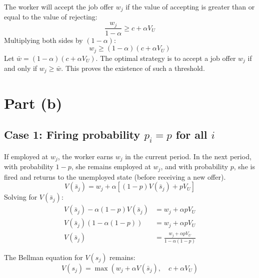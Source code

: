 \documentclass[11pt, a4paper, oneside]{memoir}
\begin{document}
The worker will accept the job offer $w_j$ if the value of accepting is greater than or equal to the value of rejecting:
\[ \frac{w_j}{1-\alpha} \ge c + \alpha V_U \]
Multiplying both sides by $(1-\alpha)$:
\[ w_j \ge (1-\alpha)(c + \alpha V_U) \]
Let $\bar{w} = (1-\alpha)(c + \alpha V_U)$.
The optimal strategy is to accept a job offer $w_j$ if and only if $w_j \ge \bar{w}$.
This proves the existence of such a threshold.

\section{Part (b)}
\subsection*{Case 1: Firing probability $p_i = p$ for all $i$}
If employed at $w_j$, the worker earns $w_j$ in the current period.
In the next period, with probability $1-p$, she remains employed at $w_j$,
and with probability $p$, she is fired and returns to the unemployed state (before receiving a new offer).
\[ V(\bar{s}_j) = w_j + \alpha \left[ (1-p)V(\bar{s}_j) + p V_U \right] \]
Solving for $V(\bar{s}_j)$:
\begin{align*} V(\bar{s}_j) - \alpha(1-p)V(\bar{s}_j) &= w_j + \alpha p V_U \\ V(\bar{s}_j) (1 - \alpha(1-p)) &= w_j + \alpha p V_U \\ V(\bar{s}_j) &= \frac{w_j + \alpha p V_U}{1 - \alpha(1-p)} \end{align*}

The Bellman equation for $V(s_j)$ remains:
\[ V(s_j) = \max \left( w_j + \alpha V(\bar{s}_j), \quad c + \alpha V_U \right) \]
\end{document}
